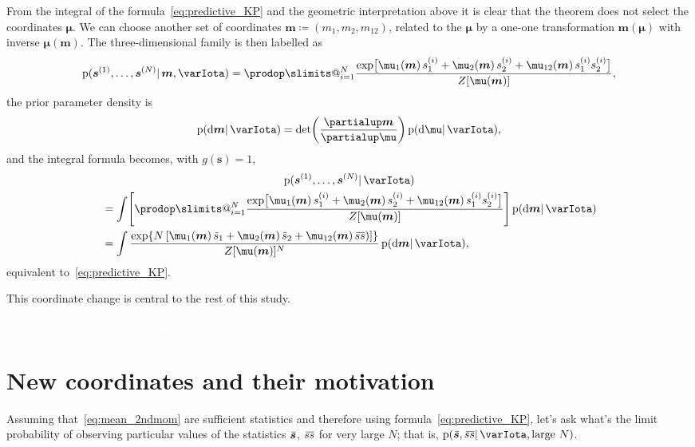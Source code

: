 \documentclass[\ifafour a4paper,12pt,\else a5paper,10pt,\fi%
onecolumn,oneside,article,%
british%
]{memoir}
\makeatletter
\theoremstyle{remark}
\theoremstyle{innote}
\def\prod{\DOTSI\prodop\slimits@}
\newcommand*{\de}{\partialup}%
\newcommand*{\di}{\mathrm{d}}%
\newcommand*{\defd}{\coloneqq}
\newcommand*{\pf}{\mathrm{p}}%
\renewcommand*{\|}{\mathpunct{|}}
\newcommand*{\widebar}[1]{{\mkern1.5mu\skew{2}\overline{\mkern-1.5mu#1\mkern-1.5mu}\mkern 1.5mu}}
\newcommand*{\yI}{\varIota}
\newcommand*{\ys}{\bm{s}}
\newcommand*{\yso}[1]{\ys^{(#1)}}
\newcommand*{\ysso}[1]{s^{(#1)}}
\newcommand*{\la}{\mu_{12}}
\newcommand*{\yth}{\bm{\mu}}
\newcommand*{\yt}{\bm{m}}
\newcommand*{\yl}{m_{12}}
\newcommand*{\yav}{\widebar{\ys}}
\newcommand*{\yavv}{\widebar{s}}
\newcommand*{\ycv}{\widebar{ss}}
\makeatother
\begin{document}
From the integral of the formula~\eqref{eq:predictive_KP} and the geometric
interpretation above it is clear that the theorem does not select the
coordinates $\yth$. We can choose another set of coordinates
$\yt \defd (m_1,m_2,\yl)$, related to the $\yth$ by a one-one
transformation $\yt(\yth)$ with inverse $\yth(\yt)$. The three-dimensional
family is then labelled as
\begin{equation}
  \label{eq:extreme_distributions_relabelled}
    \pf(\yso{1}, \dotsc, \yso{N} \|\yt, \yI ) =
  \prod_{i=1}^{N}
  \frac{  \exp\bigl[ 
    \mu_1(\yt)\, \ysso{i}_1 + \mu_2(\yt)\, \ysso{i}_2 +
    \la(\yt)\, \ysso{i}_1 \ysso{i}_2
    \bigr] }{Z[\yth(\yt)]},
\end{equation}
the prior parameter density is
\begin{equation}
  \label{eq:density_new_coords}
  \pf(\di\yt \|\yI) =
  \det\biggl( \frac{\de\yt}{\de\yth}\biggr)\, \pf(\di\yth \| \yI),
\end{equation}
and the integral formula becomes, with $g(\ys)=1$,
\begin{multline}
  \label{eq:predictive_KP}
  \pf(\yso{1}, \dotsc, \yso{N} \|\yI )
  \\
\begin{aligned}
  &=\int
\Biggl[  \prod_{i=1}^{N}
  \frac{  \exp\bigl[ 
    \mu_1(\yt)\, \ysso{i}_1 + \mu_2(\yt)\, \ysso{i}_2 +
    \la(\yt)\, \ysso{i}_1 \ysso{i}_2
    \bigr] }{Z[\yth(\yt)]}
  \Biggr]\,
  \pf(\di\yt \| \yI)
\\
  &=\int
  \frac{  \exp\{N \, [
    \mu_1(\yt)\, \yavv_1 + \mu_2(\yt)\, \yavv_2 +
    \la(\yt)\, \ycv)]\}}{Z[\yth(\yt)]^N}
\,  \pf(\di\yt \| \yI),
\end{aligned}
\end{multline}
equivalent to~\eqref{eq:predictive_KP}.

This coordinate change is central to the rest of this study.

\textcolor{white}{If you find this you can claim a postcard from me.}

\section{New coordinates and their motivation}
\label{sec:new_coords}

Assuming that~\eqref{eq:mean_2ndmom} are sufficient statistics and
therefore using formula~\eqref{eq:predictive_KP}, let's ask what's the
limit probability of observing particular values of the statistics $\yav$,
$\ycv$ for very large $N$; that is, $\pf(\yav,\ycv \| \yI, \text{large } N)$.
\end{document}
